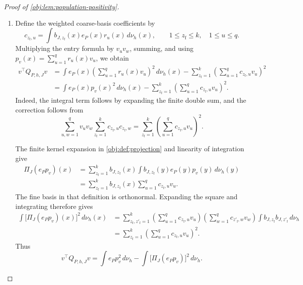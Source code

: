 \begin{proof}[Proof of \cref{obj:lem:population-positivity}]
\begin{enumerate}
\item Define the weighted coarse-basis coefficients by
\[
c_{z_{\mathrm f},u}
=\int b_{J,z_{\mathrm f}}(x)e_P(x)r_u(x)\,d\nu_h(x),
\qquad
1\le z_{\mathrm f}\le k,\quad 1\le u\le q.
\]
Multiplying the entry formula by \(v_uv_w\), summing, and using
\(p_v(x)=\sum_{u=1}^{q}r_u(x)v_u\), we obtain
\[
\begin{aligned}
v^\top Q_{P,h,J}v
&=\int e_P(x)
 \left(\sum_{u=1}^{q}r_u(x)v_u\right)^2\,d\nu_h(x)
 -\sum_{z_{\mathrm f}=1}^{k}
 \left(\sum_{u=1}^{q}c_{z_{\mathrm f},u}v_u\right)^2\\
&=\int e_P(x)p_v(x)^2\,d\nu_h(x)
 -\sum_{z_{\mathrm f}=1}^{k}
 \left(\sum_{u=1}^{q}c_{z_{\mathrm f},u}v_u\right)^2.
\end{aligned}
\]
Indeed, the integral term follows by expanding the finite double sum, and the correction follows from
\[
\sum_{u,w=1}^{q}v_uv_w
 \sum_{z_{\mathrm f}=1}^{k}c_{z_{\mathrm f},u}c_{z_{\mathrm f},w}
=
\sum_{z_{\mathrm f}=1}^{k}
 \left(\sum_{u=1}^{q}c_{z_{\mathrm f},u}v_u\right)^2.
\]

The finite kernel expansion in \cref{obj:def:projection} and linearity of integration give
\[
\begin{aligned}
\Pi_J(e_Pp_v)(x)
&=\sum_{z_{\mathrm f}=1}^{k}b_{J,z_{\mathrm f}}(x)
 \int b_{J,z_{\mathrm f}}(y)e_P(y)p_v(y)\,d\nu_h(y)\\
&=\sum_{z_{\mathrm f}=1}^{k}b_{J,z_{\mathrm f}}(x)
 \sum_{u=1}^{q}c_{z_{\mathrm f},u}v_u.
\end{aligned}
\]
The fine basis in that definition is orthonormal. Expanding the square and integrating therefore gives
\[
\begin{aligned}
\int \bigl[\Pi_J(e_Pp_v)(x)\bigr]^2\,d\nu_h(x)
&=\sum_{z_{\mathrm f},z'_{\mathrm f}=1}^{k}
 \left(\sum_{u=1}^{q}c_{z_{\mathrm f},u}v_u\right)
 \left(\sum_{w=1}^{q}c_{z'_{\mathrm f},w}v_w\right)
 \int b_{J,z_{\mathrm f}}b_{J,z'_{\mathrm f}}\,d\nu_h\\
&=\sum_{z_{\mathrm f}=1}^{k}
 \left(\sum_{u=1}^{q}c_{z_{\mathrm f},u}v_u\right)^2.
\end{aligned}
\]
Thus
\[
v^\top Q_{P,h,J}v
=\int e_Pp_v^2\,d\nu_h
 -\int \bigl[\Pi_J(e_Pp_v)\bigr]^2\,d\nu_h.
\]


\end{enumerate}
\end{proof}
